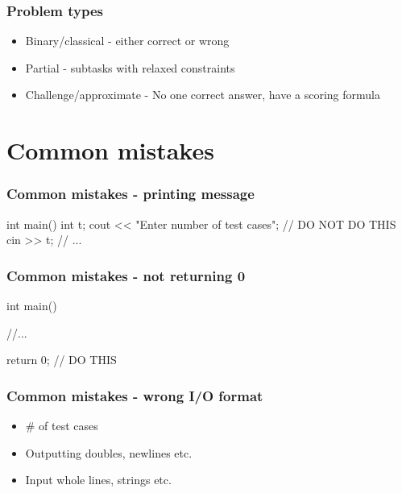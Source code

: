 \begin{frame}
    \frametitle{Problem types}
    \begin{itemize}
        \item Binary/classical - either correct or wrong \\ \pause
        \item Partial - subtasks with relaxed constraints \\ \pause
        \item Challenge/approximate - No one correct answer, have a scoring formula \\ 
    \end{itemize}
\end{frame}

\section{Common mistakes}
\begin{frame}[fragile]
    \frametitle{Common mistakes - printing message}
    \begin{cppcode}
int main() {
    int t;
    cout << "Enter number of test cases"; // DO NOT DO THIS
    cin >> t;
    // ...
}
    \end{cppcode}
\end{frame}

\begin{frame}[fragile]
    \frametitle{Common mistakes - not returning 0}
    \begin{cppcode}
int main() {
    //...

    return 0; // DO THIS
}
    \end{cppcode}
\end{frame}

\begin{frame}
    \frametitle{Common mistakes - wrong I/O format}
    \begin{itemize}
        \item \# of test cases \\ \pause
        \item Outputting doubles, newlines etc. \\ \pause
        \item Input whole lines, strings etc. \\
    \end{itemize}
\end{frame}

